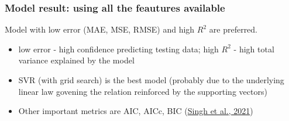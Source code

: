 \begin{frame}
    \frametitle{Model result: using all the feautures available}
    \begin{table}[]
        
    \end{table}
    Model with low error (MAE, MSE, RMSE) and high $R^2$ are preferred. 
    \begin{itemize}
        \item low error - high confidence predicting testing data; high $R^2$ - high total variance explained by the model
        \item SVR (with grid search) is the best model (probably due to the underlying linear law govening the relation reinforced by the supporting vectors) 
        \item Other important metrics are AIC, AICc, BIC (\href{https://doi.org/10.3390/rs13193794}{Singh et al., 2021})
    \end{itemize}
\end{frame}